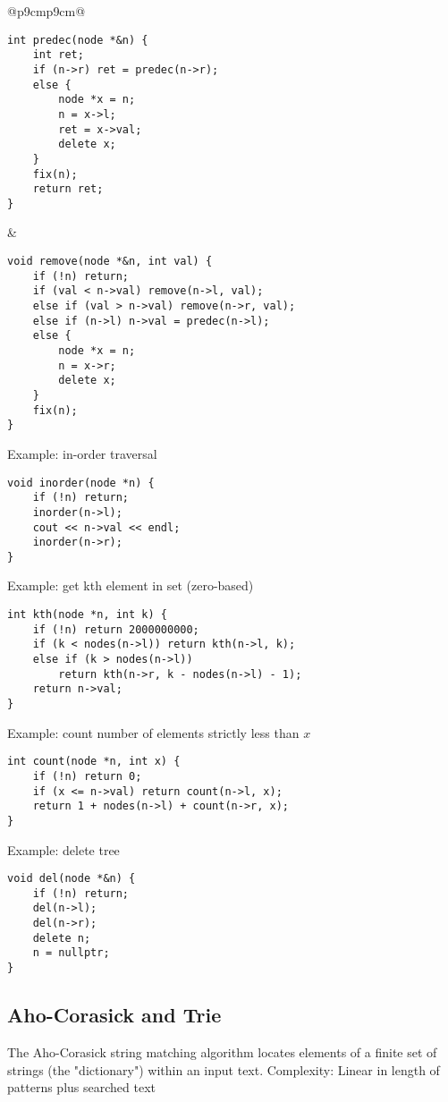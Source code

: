 \documentclass[letterpaper]{article}
\begin{document}
\begin{tabular}{@{}p{9cm}p{9cm}@{}}
\begin{lstlisting}
int predec(node *&n) {
	int ret;
	if (n->r) ret = predec(n->r);
	else {
		node *x = n;
		n = x->l;
		ret = x->val;
		delete x;
	}
	fix(n);
	return ret;
}
\end{lstlisting}
&
\begin{lstlisting}
void remove(node *&n, int val) {
	if (!n) return;
	if (val < n->val) remove(n->l, val);
	else if (val > n->val) remove(n->r, val);
	else if (n->l) n->val = predec(n->l);
	else {
		node *x = n;
		n = x->r;
		delete x;
	}
	fix(n);
}
\end{lstlisting}
Example: in-order traversal
\begin{lstlisting}
void inorder(node *n) {
	if (!n) return;
	inorder(n->l);
	cout << n->val << endl;
	inorder(n->r);
}
\end{lstlisting}
Example: get kth element in set (zero-based)
\begin{lstlisting}
int kth(node *n, int k) {
	if (!n) return 2000000000;
	if (k < nodes(n->l)) return kth(n->l, k);
	else if (k > nodes(n->l))
		return kth(n->r, k - nodes(n->l) - 1);
	return n->val;
}
\end{lstlisting}
Example: count number of elements strictly less than $x$
\begin{lstlisting}
int count(node *n, int x) {
	if (!n) return 0;
	if (x <= n->val) return count(n->l, x);
	return 1 + nodes(n->l) + count(n->r, x);
}
\end{lstlisting}
Example: delete tree
\begin{lstlisting}
void del(node *&n) {
	if (!n) return;
	del(n->l);
	del(n->r);
	delete n;
	n = nullptr;
}
\end{lstlisting}
\end{tabular}

\subsection{Aho-Corasick and Trie}

The Aho-Corasick string matching algorithm locates elements of a finite set of strings (the "dictionary") within an input text. Complexity: Linear in length of patterns plus searched text
\end{document}
